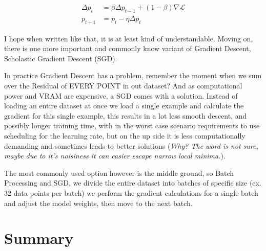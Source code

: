 \documentclass{article}
\begin{document}
\begin{align*}
    \Delta p_t &= \beta \Delta p_{t-1} + (1-\beta)\nabla\mathcal L\\
    p_{t+1} &= p_t - \eta\Delta p_t
\end{align*}

I hope when written like that, it is at least kind of understandable. Moving on, there is one more important and commonly know variant of Gradient Descent, Scholastic Gradient Descent (SGD).

In practice Gradient Descent has a problem, remember the moment when we sum over the Residual of EVERY POINT in out dataset? And as computational power and VRAM are expensive, a SGD comes with a solution. Instead of loading an entire dataset at once we load a single example and calculate the gradient for this single example, this results in a lot less smooth descent, and possibly longer training time, with in the worst case scenario requirements to use scheduling for the learning rate, but on the up side it is less computationally demanding and sometimes leads to better solutions (\textit{Why? The word is not sure, maybe due to it's noisiness it can easier escape narrow local minima.}).

The most commonly used option however is the middle ground, so Batch Processing and SGD, we divide the entire dataset into batches of specific size (ex. 32 data points per batch) we perform the gradient calculations for a single batch and adjust the model weights, then move to the next batch.

\section{Summary}
\end{document}
